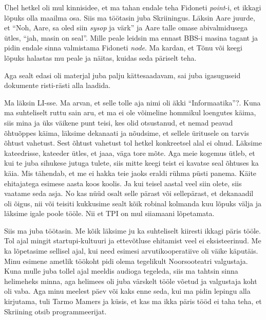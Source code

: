 Ühel  
hetkel oli mul kinnisidee, et ma tahan endale teha Fidoneti \emph{point}-i, et 
ikkagi lõpuks olla maailma osa. Siis ma töötasin juba 
Skriiningus. Läksin Aare juurde, et \enquote{Noh, Aare, 
sa oled siin \emph{sysop} ja värk} ja Aare talle omase abivalmidusega ütles, 
\enquote{jah, masin on seal}. Mille peale leidsin ma ennast BBS-i masina tagant 
ja pidin 
endale sinna valmistama Fidoneti \emph{node}. Ma kardan, et Tõnu või keegi 
lõpuks halastas mu peale ja näitas, kuidas seda päriselt teha. 

Aga sealt edasi oli materjal juba palju kättesaadavam, sai juba  
igasuguseid dokumente risti-rästi alla laadida. 


Ma läksin LI-sse. Ma arvan, et selle tolle aja nimi oli äkki 
\enquote{Informaatika}?. 
Kuna ma suhteliselt ruttu sain aru, et ma ei ole võimeline hommikul loengutes 
käima, siis mina ja üks väikene punt teisi, kes olid otsustanud, et nemad 
peavad õhtuõppes käima, läksime dekanaati ja nõudsime, et sellele üritusele on 
tarvis õhtust vahetust. Sest  õhtust vahetust tol hetkel konkreetsel alal 
ei olnud. Läksime kateedrisse, kateeder ütles, et jaaa, väga tore mõte. Aga 
meie kogemus ütleb, et kui te juba sihukese jutuga tulete, siis mitte keegi 
teist ei kavatse seal õhtuses ka käia. Mis tähendab, et me ei hakka teie jaoks  
eraldi rühma püsti panema. Käite ehitajatega esimese aasta koos koolis. Ja kui 
teisel aastal veel siin olete, siis vaatame seda asja. No kas nüüd osalt selle 
pärast või sellepärast, et dekanaadil oli õigus, nii või teisiti kukkusime 
sealt kõik robinal kolmanda kuu lõpuks välja ja läksime igale poole tööle. Nii 
et TPI on mul siiamaani lõpetamata. 


Siis ma juba töötasin. Me kõik läksime ju ka suhteliselt kiiresti ikkagi päris 
tööle. Tol ajal mingit startupi-kultuuri ja ettevõtluse ehitamist veel ei 
eksisteerinud. Me ka lõpetasime sellisel ajal, kui need esimesi 
arvutikooperatiive oli väike käputäis. Minu esimene ametlik töökoht pidi 
olema tegelikult Noorsooteatri valgustaja. Kuna mulle juba 
tollel ajal meeldis audioga tegeleda, siis ma tahtsin sinna helimeheks minna, 
aga helimees oli juba värskelt tööle võetud ja valgustaja koht oli vaba. Aga 
 minu meelest päev või kaks enne seda, kui ma pidin lepingu alla kirjutama, 
tuli Tarmo Mamers ja küsis, et kas ma ikka päris tööd 
ei 
taha teha, et Skriining otsib programmeerijat. 

